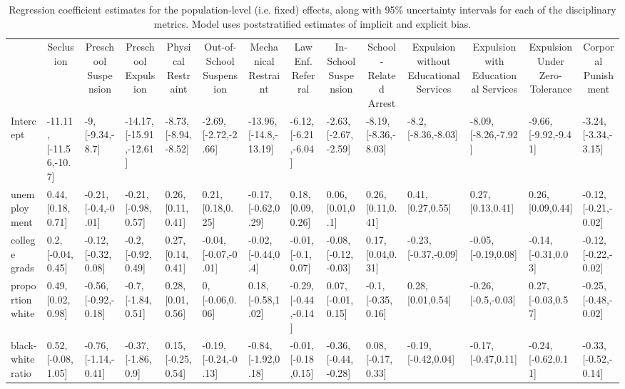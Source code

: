 \documentclass[english,floatsintext,man]{apa6}
\makeatletter
\newenvironment{lltable}
  {\begin{landscape}\begin{center}\begin{ThreePartTable}}
  {\end{ThreePartTable}\end{center}\end{landscape}}
\newcommand\LastLTentrywidth{1em}
\newlength\longtablewidth
\newcommand\getlongtablewidth{%
 \begingroup
  \ifcsname LT@\roman{LT@tables}\endcsname
  \global\longtablewidth=0pt
  \renewcommand\LT@entry[2]{\global\advance\longtablewidth by ##2\relax\gdef\LastLTentrywidth{##2}}%
  \@nameuse{LT@\roman{LT@tables}}%
  \fi
\endgroup}
\theoremstyle{definition}
\theoremstyle{definition}
\theoremstyle{remark}
\makeatother
\begin{document}
\begin{lltable}
\small{
\begin{longtable}{llllllllllllll}\noalign{\getlongtablewidth\global\LTcapwidth=\longtablewidth}
\caption{\label{tab:mod-post}Regression coefficient estimates for the population-level (i.e. fixed) effects, along with 95\% uncertainty intervals for each of the disciplinary metrics. Model uses poststratified estimates of implicit and explicit bias.}\\
\toprule
 & \multicolumn{1}{c}{Seclusion} & \multicolumn{1}{c}{Preschool Suspension} & \multicolumn{1}{c}{Preschool Expulsion} & \multicolumn{1}{c}{Physical Restraint} & \multicolumn{1}{c}{Out-of-School Suspension} & \multicolumn{1}{c}{Mechanical Restraint} & \multicolumn{1}{c}{Law Enf. Referral} & \multicolumn{1}{c}{In-School Suspension} & \multicolumn{1}{c}{School-Related Arrest} & \multicolumn{1}{c}{Expulsion without Educational Services} & \multicolumn{1}{c}{Expulsion with Educational Services} & \multicolumn{1}{c}{Expulsion Under Zero-Tolerance} & \multicolumn{1}{c}{Corporal Punishment}\\
\midrule
Intercept & -11.11, [-11.56,-10.7] & -9, [-9.34,-8.7] & -14.17, [-15.91,-12.61] & -8.73, [-8.94,-8.52] & -2.69, [-2.72,-2.66] & -13.96, [-14.8,-13.19] & -6.12, [-6.21,-6.04] & -2.63, [-2.67,-2.59] & -8.19, [-8.36,-8.03] & -8.2, [-8.36,-8.03] & -8.09, [-8.26,-7.92] & -9.66, [-9.92,-9.41] & -3.24, [-3.34,-3.15]\\
unemployment & 0.44, [0.18,0.71] & -0.21, [-0.4,-0.01] & -0.21, [-0.98,0.57] & 0.26, [0.11,0.41] & 0.21, [0.18,0.25] & -0.17, [-0.62,0.29] & 0.18, [0.09,0.26] & 0.06, [0.01,0.1] & 0.26, [0.11,0.41] & 0.41, [0.27,0.55] & 0.27, [0.13,0.41] & 0.26, [0.09,0.44] & -0.12, [-0.21,-0.02]\\
college grads & 0.2, [-0.04,0.45] & -0.12, [-0.32,0.08] & -0.2, [-0.92,0.49] & 0.27, [0.14,0.41] & -0.04, [-0.07,-0.01] & -0.02, [-0.44,0.4] & -0.01, [-0.1,0.07] & -0.08, [-0.12,-0.03] & 0.17, [0.04,0.31] & -0.23, [-0.37,-0.09] & -0.05, [-0.19,0.08] & -0.14, [-0.31,0.03] & -0.12, [-0.22,-0.02]\\
proportion white & 0.49, [0.02,0.98] & -0.56, [-0.92,-0.18] & -0.7, [-1.84,0.51] & 0.28, [0.01,0.56] & 0, [-0.06,0.06] & 0.18, [-0.58,1.02] & -0.29, [-0.44,-0.14] & 0.07, [-0.01,0.15] & -0.1, [-0.35,0.16] & 0.28, [0.01,0.54] & -0.26, [-0.5,-0.03] & 0.27, [-0.03,0.57] & -0.25, [-0.48,-0.02]\\
black-white ratio & 0.52, [-0.08,1.05] & -0.76, [-1.14,-0.41] & -0.37, [-1.86,0.9] & 0.15, [-0.25,0.54] & -0.19, [-0.24,-0.13] & -0.84, [-1.92,0.18] & -0.01, [-0.18,0.15] & -0.36, [-0.44,-0.28] & 0.08, [-0.17,0.33] & -0.19, [-0.42,0.04] & -0.17, [-0.47,0.11] & -0.24, [-0.62,0.11] & -0.33, [-0.52,-0.14]\\

\end{longtable}}
\end{lltable}
\end{document}
